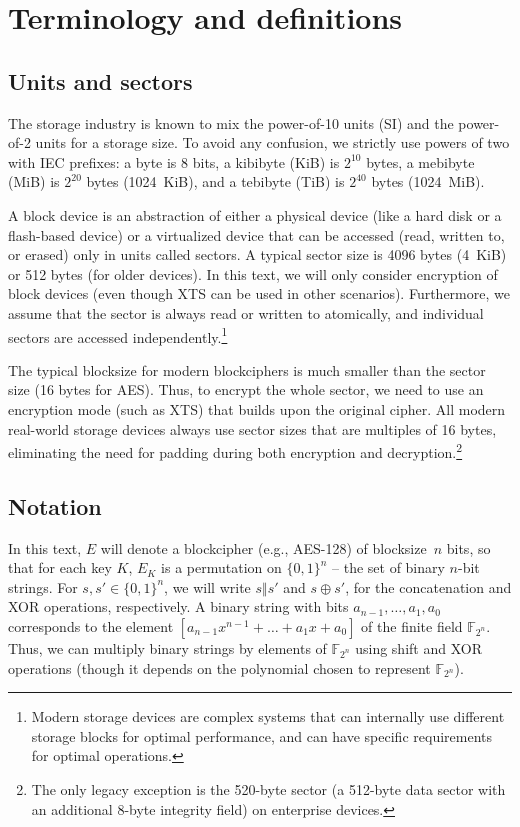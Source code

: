 \documentclass[a4paper]{article}
\begin{document}
\section{Terminology and definitions} \label{sec:terminology}

\subsection{Units and sectors}\label{sec:hardware}
The storage industry is known to mix the power-of-10 units (SI) and the power-of-2 units for a storage size. To avoid any confusion, we strictly use powers of two with IEC prefixes: a byte is 8 bits, a kibibyte (KiB) is $2^{10}$ bytes, a mebibyte (MiB) is $2^{20}$ bytes (1024~KiB), and a tebibyte (TiB) is $2^{40}$ bytes (1024~MiB).

A block device is an abstraction of either a physical device (like a hard disk or a flash-based device) or a virtualized device that can be accessed (read, written to, or erased) only in units called sectors. A typical sector size is 4096 bytes (4~KiB) or 512 bytes (for older devices).
In this text, we will only consider encryption of block devices (even though XTS can be used in other scenarios).
Furthermore, we assume that the sector is always read or written to atomically, and individual sectors are accessed independently.\footnote{Modern storage devices are complex systems that can internally use different storage blocks for optimal performance, and can have specific requirements for optimal operations.}

The typical blocksize for modern blockciphers is much smaller than the sector size (16 bytes for AES).
Thus, to encrypt the whole sector, we need to use an encryption mode (such as XTS) that builds upon the original cipher. All modern real-world storage devices always use sector sizes that are multiples of 16 bytes, eliminating the need for padding during both encryption and decryption.\footnote{The only legacy exception is the 520-byte sector (a 512-byte data sector with an additional 8-byte integrity field) on enterprise devices.}

\subsection{Notation}
In this text, $E$ will denote a blockcipher (e.g., AES-128) of blocksize~$n$ bits, so that for each key $K$, $E_K$ is a permutation on $\{0,1\}^n$ -- the set of binary $n$-bit strings. For $s,s'\in \{0,1\}^n$, we will write $s \Vert s'$ and $s \oplus s'$, for the concatenation and XOR operations, respectively.
A binary string with bits $a_{n-1},\dots, a_1, a_0$ corresponds to the element $[a_{n-1}x^{n-1} + \dots + a_1x + a_0]$ of the finite field $\mathbb{F}_{2^n}$.
Thus, we can multiply binary strings by elements of $\mathbb{F}_{2^n}$ using shift and XOR operations (though it depends on the polynomial chosen to represent $\mathbb{F}_{2^n}$).
\end{document}
